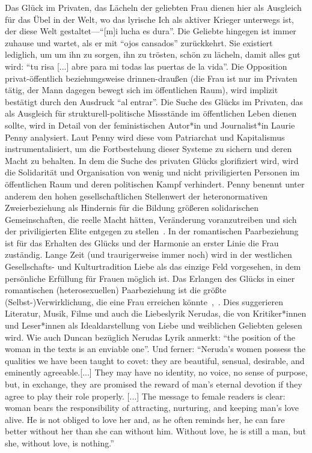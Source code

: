 Das Glück im Privaten, das Lächeln der geliebten Frau dienen hier als Ausgleich für das Übel in der Welt, wo das lyrische Ich als aktiver Krieger unterwegs ist, der diese Welt gestaltet—``[m]i lucha es dura''.
Die Geliebte hingegen ist immer zuhause und wartet, als er mit ``ojos cansados'' zurückkehrt.
Sie existiert lediglich, um um ihn zu sorgen, ihn zu trösten, schön zu lächeln, damit alles gut wird: ``tu risa [...] abre para mi todas las puertas de la vida''.
Die Opposition privat-öffentlich beziehungsweise drinnen-draußen (die Frau ist nur im Privaten tätig, der Mann dagegen bewegt sich im öffentlichen Raum), wird implizit bestätigt durch den Ausdruck ``al entrar''.
Die Suche des Glücks im Privaten, das als Ausgleich für strukturell-politische Missstände im öffentlichen Leben dienen sollte, wird in Detail von der feministischen Autor*in und Journalist*in Laurie Penny analysiert.
Laut Penny wird diese vom Patriarchat und Kapitalismus instrumentalisiert, um die Fortbestehung dieser Systeme zu sichern und deren Macht zu behalten.
In dem die Suche des privaten Glücks glorifiziert wird, wird die Solidarität und Organisation von wenig und nicht priviligierten Personen im öffentlichen Raum und deren politischen Kampf verhindert.
Penny benennt unter anderem den hohen gesellschaftlichen Stellenwert der heteronormativen Zweierbeziehung als Hindernis für die Bildung größeren solidarischen Gemeinschaften, die reelle Macht hätten, Veränderung voranzutreiben und sich der priviligierten Elite entgegen zu stellen~\cite{Penny2014}.
In der romantischen Paarbeziehung ist für das Erhalten des Glücks und der Harmonie an erster Linie die Frau zuständig.
Lange Zeit (und traurigerweise immer noch) wird in der westlichen Gesellschafts- und Kulturtradition Liebe als das einzige Feld vorgesehen, in dem persönliche Erfüllung für Frauen möglich ist. %
Das Erlangen des Glücks in einer romantischen (heterosexuellen) Paarbeziehung ist die größte (Selbst-)Verwirklichung, die eine Frau erreichen könnte~\cite{Duncan1992},~\cite{Penny2014}.
Dies suggerieren Literatur, Musik, Filme und auch die Liebeslyrik Nerudas, die von Kritiker*innen und Leser*innen als Idealdarstellung von Liebe und weiblichen Geliebten gelesen wird.
Wie auch Duncan bezüglich Nerudas Lyrik anmerkt: ``the position of the woman in the texts is an enviable one''.
Und ferner: ``Neruda's women possess the qualities we have been taught to covet: they are beautiful,  sensual, desirable, and eminently agreeable.[...] They may have no identity, no voice, no sense of purpose, but, in exchange, they are promised the reward of man's eternal devotion if they agree to play their role properly.
[...] The message to  female readers is clear: woman bears the responsibility of attracting, nurturing, and keeping man's love alive. He is not obliged to love her and, as he often reminds her, he can fare better without her than she  can without him. Without love, he is still a man, but she, without love, is nothing.''

